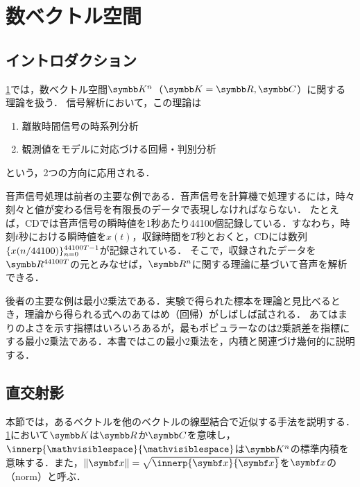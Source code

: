 \documentclass[../../main]{subfiles}
\begin{document}
\chapter{数ベクトル空間}
\label{chapter:numerical_vector_space}

\section{イントロダクション}
\label{section:numerical_vector_space_introduction}

\cref{chapter:numerical_vector_space}では，数ベクトル空間\(\numset{K}^n\)（\(\numset{K}=\numset{R},\numset{C}\)）に関する理論を扱う．
信号解析において，この理論は
\begin{enumerate}
  \item 離散時間信号の時系列分析
  \item 観測値をモデルに対応づける回帰・判別分析
\end{enumerate}
という，2つの方向に応用される．

音声信号処理は前者の主要な例である．音声信号を計算機で処理するには，時々刻々と値が変わる信号を有限長のデータで表現しなければならない．
たとえば，CDでは音声信号の瞬時値を1秒あたり44100個記録している．すなわち，時刻\(t\)秒における瞬時値を\(x(t)\)，収録時間を\(T\)秒とおくと，CDには数列\(\lbrace x(n/44100)\rbrace_{n=0}^{44100T-1}\)が記録されている．
そこで，収録されたデータを\(\numset{R}^{44100T}\)の元とみなせば，\(\numset{R}^n\)に関する理論に基づいて音声を解析できる．

後者の主要な例は最小2乗法である．実験で得られた標本を理論と見比べるとき，理論から得られる式へのあてはめ（回帰）がしばしば試される．
あてはまりのよさを示す指標はいろいろあるが，最もポピュラーなのは2乗誤差を指標にする最小2乗法である．本書ではこの最小2乗法を，内積と関連づけ幾何的に説明する．

\pagebreak

\section{直交射影}

本節では，あるベクトルを他のベクトルの線型結合で近似する手法を説明する．\cref{chapter:numerical_vector_space}において\(\numset{K}\)は\(\numset{R}\)か\(\numset{C}\)を意味し，
\(\innerp{\holder}{\holder}\)は\(\numset{K}^n\)の標準内積を意味する．また，\(\vnorm{\vect{x}}=\sqrt{\innerp{\vect{x}}{\vect{x}}}\)を\(\vect{x}\)の\indexsymbol{\(\vnorm{\holder}\)}（norm）と呼ぶ．
\end{document}
